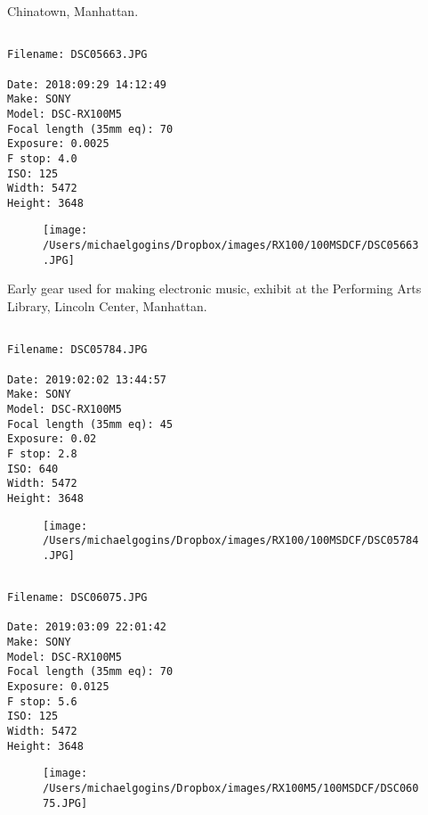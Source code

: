 \documentclass[11pt,letter,DIV=14,paper=landscape]{scrbook}
\begin{document}
\clearpage
\noindent Chinatown, Manhattan.
\noindent
\begin{lstlisting}

Filename: DSC05663.JPG

Date: 2018:09:29 14:12:49
Make: SONY
Model: DSC-RX100M5
Focal length (35mm eq): 70
Exposure: 0.0025
F stop: 4.0
ISO: 125
Width: 5472
Height: 3648
\end{lstlisting}
\clearpage

\begin{figure}
\texttt{[image: /Users/michaelgogins/Dropbox/images/RX100/100MSDCF/DSC05663.JPG]}
\end{figure}
    
\clearpage
\noindent Early gear used for making electronic music, exhibit at the Performing Arts Library, Lincoln Center, Manhattan.
\noindent
\begin{lstlisting}

Filename: DSC05784.JPG

Date: 2019:02:02 13:44:57
Make: SONY
Model: DSC-RX100M5
Focal length (35mm eq): 45
Exposure: 0.02
F stop: 2.8
ISO: 640
Width: 5472
Height: 3648
\end{lstlisting}
\clearpage

\begin{figure}
\texttt{[image: /Users/michaelgogins/Dropbox/images/RX100/100MSDCF/DSC05784.JPG]}
\end{figure}
    
\clearpage
\noindent 
\noindent
\begin{lstlisting}

Filename: DSC06075.JPG

Date: 2019:03:09 22:01:42
Make: SONY
Model: DSC-RX100M5
Focal length (35mm eq): 70
Exposure: 0.0125
F stop: 5.6
ISO: 125
Width: 5472
Height: 3648
\end{lstlisting}
\clearpage

\begin{figure}
\texttt{[image: /Users/michaelgogins/Dropbox/images/RX100M5/100MSDCF/DSC06075.JPG]}
\end{figure}
    
\end{document}
